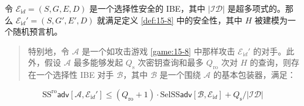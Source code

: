 \begin{theorem}\label{theo:15-5}
令 $\mathcal{E}_{\mathrm{i}d}=(S,G,E,D)$ 是一个选择性安全的 IBE，其中 $|\mathcal{ID}|$ 是超多项式的。那么 $\mathcal{E}_{\mathrm{i}d}'=(S,G',E',D)$ 就满足定义 \ref{def:15-8} 中的安全性，其中 $H$ 被建模为一个随机预言机。
\begin{quote}
特别地，令 $\mathcal{A}$ 是一个如攻击游戏 \ref{game:15-8} 中那样攻击 $\mathcal{E}_{\mathrm{i}d}'$ 的对手。此外，假设 $\mathcal{A}$ 最多能够发起 $Q_\mathrm{s}$ 次密钥查询和最多 $Q_\mathrm{ro}$ 次对 $H$ 的查询，则存在一个选择性 IBE 对手 $\mathcal{B}$，其中 $\mathcal{B}$ 是一个围绕 $\mathcal{A}$ 的基本包装器，满足：
\end{quote}
\begin{equation}\label{eq:15-25}
\mathrm{SS}^\mathrm{ro}\mathsf{adv}[\mathcal{A},\mathcal{E}_{\mathrm{i}d}']
\leq
(Q_\mathrm{ro}+1)\cdot
\mathrm{SelSS}\mathsf{adv}[\mathcal{B},\mathcal{E}_{\mathrm{i}d}]
+Q_\mathrm{s}/|\mathcal{ID}|
\end{equation}
\end{theorem}

